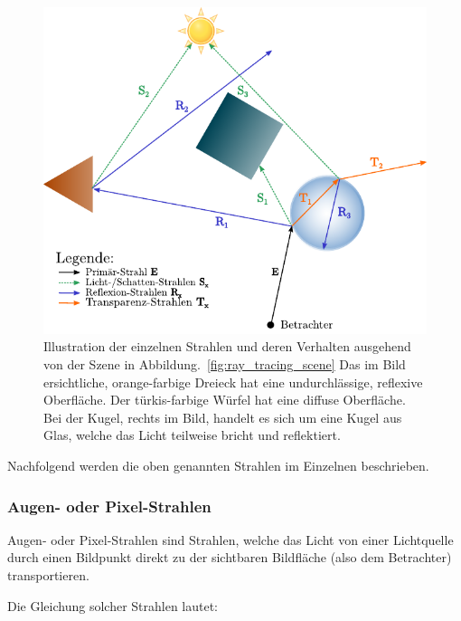 \begin{figure}[H]\label{fig:ray_tracing_scene_rays}
    \centering
    \includegraphics{img/ray_tracing_scene_rays.pdf}
    \caption{Illustration der einzelnen Strahlen und deren Verhalten
        ausgehend von der Szene in
        Abbildung.~\ref{fig:ray_tracing_scene}\protect\footnotemark{}
        Das im Bild ersichtliche, orange-farbige Dreieck hat eine
        undurchlässige, reflexive Oberfläche. Der türkis-farbige Würfel
        hat eine diffuse Oberfläche.  Bei der Kugel, rechts im Bild,
        handelt es sich um eine Kugel aus Glas, welche das Licht
        teilweise bricht und reflektiert.}
\end{figure}


Nachfolgend werden die oben genannten Strahlen im Einzelnen beschrieben.

\subsubsection{Augen- oder Pixel-Strahlen}
\label{ssubsec:ray_tracing:eye_rays}

Augen- oder Pixel-Strahlen sind Strahlen, welche das Licht von einer
Lichtquelle durch einen Bildpunkt direkt zu der sichtbaren Bildfläche
(also dem Betrachter) transportieren.

Die Gleichung solcher Strahlen lautet:


